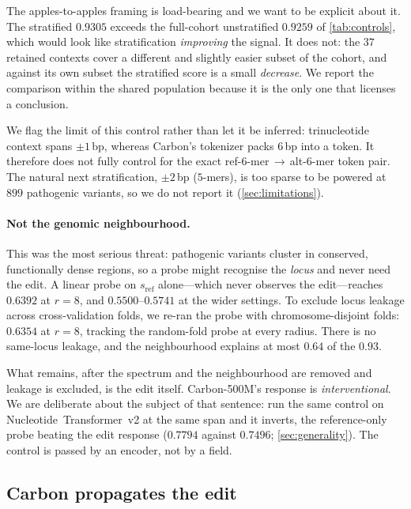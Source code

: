 \documentclass{article}
\newcommand{\sref}{s_{\mathrm{ref}}}
\newcommand{\carbon}{Carbon-500M\xspace}
\begin{document}
The apples-to-apples framing is load-bearing and we want to be explicit about it. The stratified
$0.9305$ exceeds the full-cohort unstratified $0.9259$ of \cref{tab:controls}, which would look like
stratification \emph{improving} the signal. It does not: the $37$ retained contexts cover a
different and slightly easier subset of the cohort, and against its own subset the stratified score
is a small \emph{decrease}. We report the comparison within the shared population because it is the
only one that licenses a conclusion.

We flag the limit of this control rather than let it be inferred: trinucleotide context spans
$\pm1$\,bp, whereas Carbon's tokenizer packs $6$\,bp into a token. It therefore does not fully
control for the exact ref-$6$-mer\,$\to$\,alt-$6$-mer token pair. The natural next stratification,
$\pm2$\,bp ($5$-mers), is too sparse to be powered at $899$ pathogenic variants, so we do not report
it (\cref{sec:limitations}).

\paragraph{Not the genomic neighbourhood.} This was the most serious threat: pathogenic variants
cluster in conserved, functionally dense regions, so a probe might recognise the \emph{locus} and
never need the edit. A linear probe on $\sref$ alone---which never observes the edit---reaches
$0.6392$ at $r{=}8$, and $0.5500$--$0.5741$ at the wider settings. To exclude locus leakage across
cross-validation folds, we re-ran the probe with chromosome-disjoint folds: $0.6354$ at $r{=}8$,
tracking the random-fold probe at every radius. There is no same-locus leakage, and the
neighbourhood explains at most $0.64$ of the $0.93$.

What remains, after the spectrum and the neighbourhood are removed and leakage is excluded, is the
edit itself. \carbon's response is \emph{interventional}. We are deliberate about the subject of
that sentence: run the same control on Nucleotide~Transformer~v2 at the same span and it inverts,
the reference-only probe beating the edit response ($0.7794$ against $0.7496$; \cref{sec:generality}).
The control is passed by an encoder, not by a field.

\figAUROC
\tabTrinuc

\subsection{Carbon propagates the edit}
\label{sec:propagation}
\end{document}
